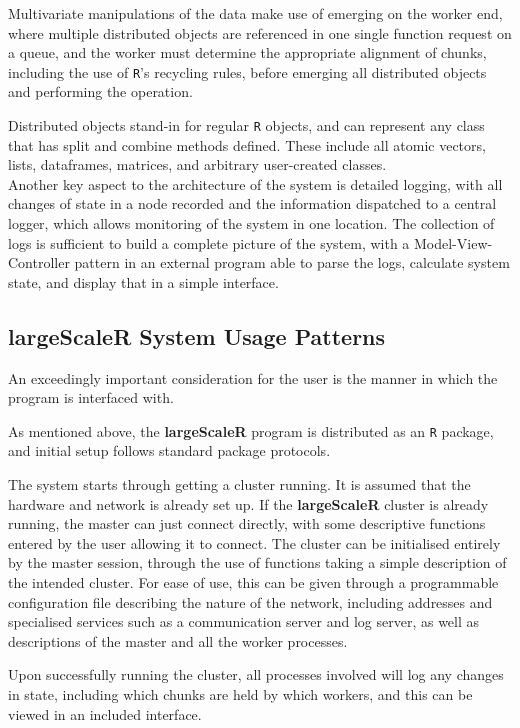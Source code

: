 Multivariate manipulations of the data make use of emerging on the worker end, where multiple distributed objects are referenced in one single function request on a queue, and the worker must determine the appropriate alignment of chunks, including the use of \texttt{R}'s recycling rules, before emerging all distributed objects and performing the operation.

Distributed objects stand-in for regular \texttt{R} objects, and can represent any class that has split and combine methods defined.
These include all atomic vectors, lists, dataframes, matrices, and arbitrary user-created classes.\\

Another key aspect to the architecture of the system is detailed logging, with all changes of state in a node recorded and the information dispatched to a central logger, which allows monitoring of the system in one location. The collection of logs is sufficient to build a complete picture of the system, with a Model-View-Controller pattern in an external program able to parse the logs, calculate system state, and display that in a simple interface\cite{gamma1995design}.

\subsection{\textbf{largeScaleR} System Usage Patterns}

An exceedingly important consideration for the user is the manner in which the program is interfaced with.

As mentioned above, the \textbf{largeScaleR} program is distributed as an \texttt{R} package, and initial setup follows standard package protocols.

The system starts through getting a cluster running.
It is assumed that the hardware and network is already set up.
If the \textbf{largeScaleR} cluster is already running, the master can just connect directly, with some descriptive functions entered by the user allowing it to connect.
The cluster can be initialised entirely by the master session, through the use of functions taking a simple description of the intended cluster.
For ease of use, this can be given through a programmable configuration file describing the nature of the network, including addresses and specialised services such as a communication server and log server, as well as descriptions of the master and all the worker processes.

Upon successfully running the cluster, all processes involved will log any changes in state, including which chunks are held by which workers, and this can be viewed in an included interface.

